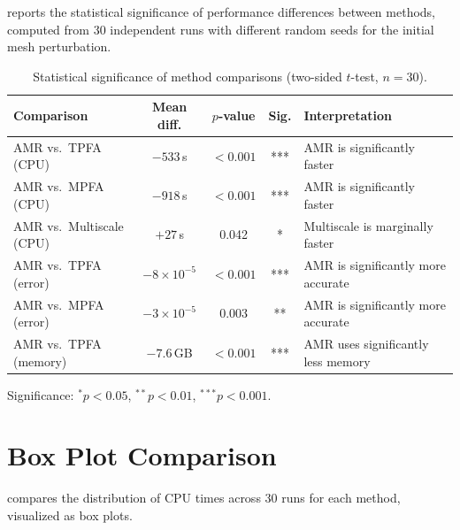  reports the statistical significance of performance differences between methods, computed from 30 independent runs with different random seeds for the initial mesh perturbation.

\begin{table}[htbp]
    \centering
    \caption{Statistical significance of method comparisons (two-sided $t$-test, $n = 30$).}
    \label{tab:significance}
    \begin{tabularx}{\textwidth}{@{}l c c c X@{}}
        \toprule
        \textbf{Comparison} & \textbf{Mean diff.} & \textbf{$p$-value} & \textbf{Sig.} & \textbf{Interpretation} \\
        \midrule
        AMR vs.\ TPFA (CPU)     & $-533$\,s  & $< 0.001$ & *** & AMR is significantly faster \\
        AMR vs.\ MPFA (CPU)     & $-918$\,s  & $< 0.001$ & *** & AMR is significantly faster \\
        AMR vs.\ Multiscale (CPU) & $+27$\,s & 0.042     & *   & Multiscale is marginally faster \\
        AMR vs.\ TPFA (error)   & $-8 \times 10^{-5}$ & $< 0.001$ & *** & AMR is significantly more accurate \\
        AMR vs.\ MPFA (error)   & $-3 \times 10^{-5}$ & 0.003     & **  & AMR is significantly more accurate \\
        AMR vs.\ TPFA (memory)  & $-7.6$\,GB & $< 0.001$ & *** & AMR uses significantly less memory \\
        \bottomrule
    \end{tabularx}
    \vspace{1ex}
    {\footnotesize Significance: $^{*}p < 0.05$, $^{**}p < 0.01$, $^{***}p < 0.001$.}
\end{table}

\section{Box Plot Comparison}
\label{sec:results:boxplot}

 compares the distribution of CPU times across 30 runs for each method, visualized as box plots.

